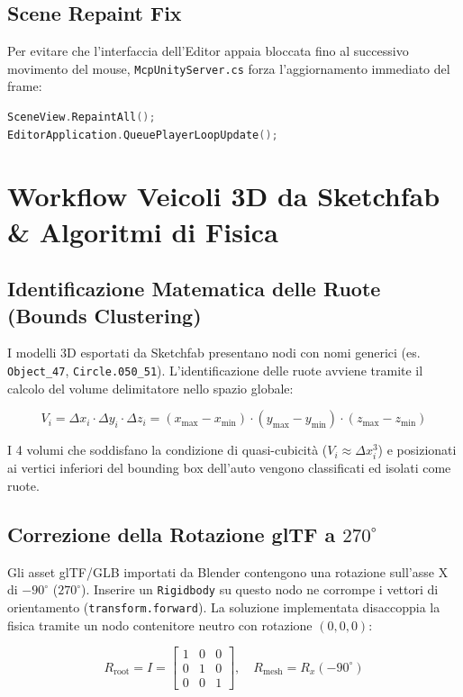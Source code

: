 \documentclass[11pt,a4paper]{article}
\begin{document}
\subsection{Scene Repaint Fix}
Per evitare che l'interfaccia dell'Editor appaia bloccata fino al successivo movimento del mouse, \texttt{McpUnityServer.cs} forza l'aggiornamento immediato del frame:

\begin{lstlisting}[language=C++, caption={Frammento C\# per l'aggiornamento istantaneo dell'Editor}]
SceneView.RepaintAll();
EditorApplication.QueuePlayerLoopUpdate();
\end{lstlisting}

\section{Workflow Veicoli 3D da Sketchfab \& Algoritmi di Fisica}

\subsection{Identificazione Matematica delle Ruote (Bounds Clustering)}
I modelli 3D esportati da Sketchfab presentano nodi con nomi generici (es. \texttt{Object\_47}, \texttt{Circle.050\_51}). L'identificazione delle ruote avviene tramite il calcolo del volume delimitatore nello spazio globale:

\begin{equation}
V_i = \Delta x_i \cdot \Delta y_i \cdot \Delta z_i = (x_{\max} - x_{\min}) \cdot (y_{\max} - y_{\min}) \cdot (z_{\max} - z_{\min})
\end{equation}

I 4 volumi che soddisfano la condizione di quasi-cubicità ($V_i \approx \Delta x_i^3$) e posizionati ai vertici inferiori del bounding box dell'auto vengono classificati ed isolati come ruote.

\subsection{Correzione della Rotazione glTF a $270^\circ$}
Gli asset glTF/GLB importati da Blender contengono una rotazione sull'asse X di $-90^\circ$ ($270^\circ$). Inserire un \texttt{Rigidbody} su questo nodo ne corrompe i vettori di orientamento (\texttt{transform.forward}). La soluzione implementata disaccoppia la fisica tramite un nodo contenitore neutro con rotazione $(0,0,0)$:

\begin{equation}
R_{\text{root}} = I = \begin{bmatrix} 1 & 0 & 0 \\ 0 & 1 & 0 \\ 0 & 0 & 1 \end{bmatrix}, \quad R_{\text{mesh}} = R_x(-90^\circ)
\end{equation}
\end{document}
